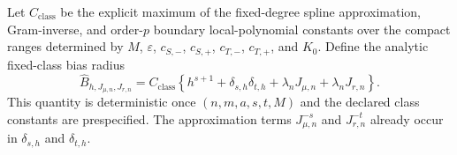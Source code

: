 Let \(C_{\mathrm{class}}\) be the explicit maximum of the fixed-degree spline approximation, Gram-inverse, and order-\(p\) boundary local-polynomial constants over the compact ranges determined by \(M\), \(\varepsilon\), \(c_{S,-}\), \(c_{S,+}\), \(c_{T,-}\), \(c_{T,+}\), and \(K_0\).  Define the analytic fixed-class bias radius
\[
\widehat B_{h,J_{\mu,n},J_{r,n}}
=C_{\mathrm{class}}\left\{
h^{s+1}+\delta_{s,h}\delta_{t,h}
+\lambda_nJ_{\mu,n}+\lambda_nJ_{r,n}
\right\}.
\]
This quantity is deterministic once \((n,m,a,s,t,M)\) and the declared class constants are prespecified.  The approximation terms \(J_{\mu,n}^{-s}\) and \(J_{r,n}^{-t}\) already occur in \(\delta_{s,h}\) and \(\delta_{t,h}\).